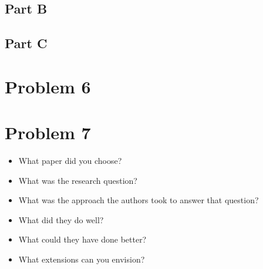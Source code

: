 \documentclass[12pt]{article}
\begin{document}
\subsection*{Part B}
\subsection*{Part C}
\section*{Problem 6}
\section*{Problem 7}

\begin{itemize}
    \item What paper did you choose?
    \item What was the research question?
    \item What was the approach the authors took to answer that question?
    \item What did they do well?
    \item What could they have done better?
    \item What extensions can you envision?
\end{itemize}
\end{document}

